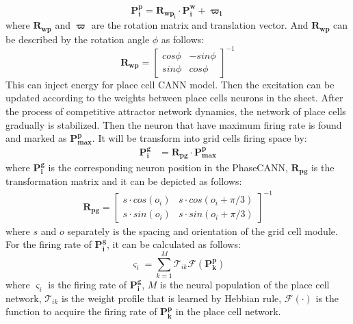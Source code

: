\documentclass[final,5p,times,twocolumn]{elsarticle}
\begin{document}
\begin{equation}\label{eq:worldframe2pcframe} 
	\boldsymbol{P^p_i} = \boldsymbol{R_{wp_i}}\cdot \boldsymbol{P^w_i} + \boldsymbol{\varpi_i}
\end{equation}	
where $\boldsymbol{R_{wp}}$ and $\boldsymbol{\varpi}$ are the rotation matrix and translation vector. And $\boldsymbol{R_{wp}}$ can be described by the rotation angle $\phi$ as follows:
\begin{equation}\label{eq:rotation_matrix}
	\boldsymbol{R_{wp}} =
	\begin{bmatrix}
		cos\phi& -sin\phi\\
		sin\phi& cos\phi
	\end{bmatrix}^{-1}
\end{equation}
This can inject energy for place cell CANN model. Then the excitation can be updated according to the weights between place cells neurons in the sheet\citep{McNaughton2006c}. After the process of competitive attractor network dynamics, the network of place cells gradually is stabilized. Then the neuron that have maximum firing rate is found and marked as $\boldsymbol{P^p_\text{max}}$. It will be transform into grid cells firing space by:
\begin{align}\label{eq:cal_position}
	\bm{P^g_i} &= \bm{R_{pg}}\cdot \bm{P^p_\text{max}} 
\end{align}
where $\boldsymbol{P^g_i}$ is the corresponding neuron position in the PhaseCANN, $\boldsymbol{R_{pg}}$ is the transformation matrix and it can be depicted as follows:
\begin{align}
	\boldsymbol{R_{pg}} =
	\begin{bmatrix}
		s\cdot cos(o_i)& s\cdot cos(o_i+\pi/3)\\
		s\cdot sin(o_i)& s\cdot sin(o_i+\pi/3)
	\end{bmatrix}^{-1}
\end{align}
where $s$ and $o$ separately is the spacing and orientation of the grid cell module. For the firing rate of $\bm{P^g_i}$, it can be calculated as follows:
\begin{equation}\label{eq:cal_rate}
	\varsigma_i = \sum_{k=1}^{M} \mathcal{T}_{ik} \mathcal{F}(\bm{P^p_k})
\end{equation}
where $\varsigma_i$ is the firing rate of $\bm{P^g_i}$, $M$ is the neural population of the place cell network, $\mathcal{T}_{ik}$ is the weight profile that is learned by Hebbian rule, $\mathcal{F}(\cdot)$ is the function to acquire the firing rate of $\bm{P^p_k}$ in the place cell network.
\end{document}
